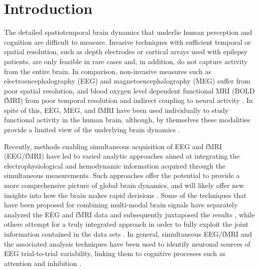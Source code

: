 \section*{Introduction}
The detailed spatiotemporal brain dynamics that underlie human perception and cognition are difficult to measure. Invasive techniques with sufficient temporal or spatial resolution, such as depth electrodes or cortical arrays used with epilepsy patients, are only feasible in rare cases and, in addition, do not capture activity from the entire brain.  In comparison, non-invasive measures such as electroencephalography (EEG) and magnetoencephalography (MEG) suffer from poor spatial resolution, and blood oxygen level dependent functional MRI (BOLD fMRI) from poor temporal resolution and indirect coupling to neural activity \cite{Logothetis2008}.  In spite of this, EEG, MEG, and fMRI have been used individually to study functional activity in the human brain, although, by themselves these modalities provide a limited view of the underlying brain dynamics \cite{Alexander2015}.  

Recently, methods enabling simultaneous acquisition of EEG and fMRI (EEG/fMRI) have led to varied analytic approaches aimed at integrating the electrophysiological and hemodynamic information acquired through the simultaneous measurements.  Such approaches offer the potential to provide a more comprehensive picture of global brain dynamics, and will likely offer new insights into how the brain makes rapid decisions  \cite{Huster2012,Jorge2014}. Some of the techniques that have been proposed for combining multi-modal brain signals have separately analyzed the EEG and fMRI data and subsequently juxtaposed the results \cite{Plichta2013,Yuan2010}, while others attempt for a truly integrated approach in order to fully exploit the joint information contained in the data sets \cite{Dahne2015}. In general, simultaneous EEG/fMRI and the associated analysis techniques have been used to identify neuronal sources of EEG trial-to-trial variability, linking them to cognitive processes such as attention \cite{Warbrick2013a} and inhibition \cite{Baumeister2014}. 

